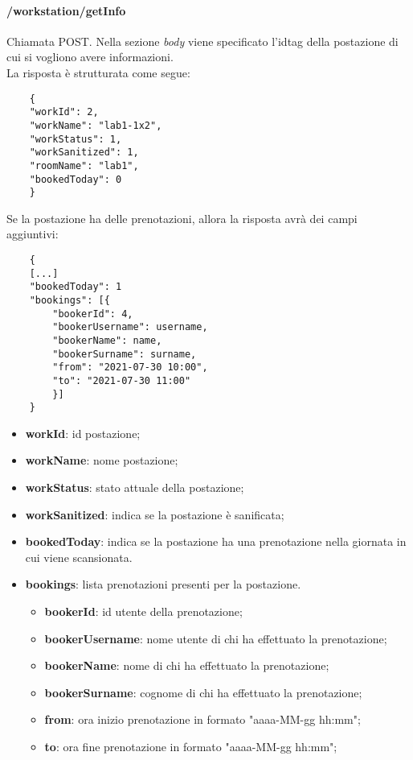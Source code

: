 \paragraph{/workstation/getInfo}
Chiamata POST. Nella sezione \textit{body} viene specificato l'idtag della postazione di cui si vogliono avere informazioni.\\
La risposta è strutturata come segue:
\begin{center}
	\begin{lstlisting}
	{
	"workId": 2,
	"workName": "lab1-1x2", 
	"workStatus": 1, 
	"workSanitized": 1, 
	"roomName": "lab1", 
	"bookedToday": 0
	}
	\end{lstlisting}
\end{center}
Se la postazione ha delle prenotazioni, allora la risposta avrà dei campi aggiuntivi:
\begin{center}
	\begin{lstlisting}
	{
	[...]
	"bookedToday": 1
	"bookings": [{
		"bookerId": 4,
		"bookerUsername": username,
		"bookerName": name,
		"bookerSurname": surname,
		"from": "2021-07-30 10:00",
		"to": "2021-07-30 11:00"
		}]
	}
	\end{lstlisting}
\end{center}
\begin{itemize}
	\item \textbf{workId}: id postazione;
	\item \textbf{workName}: nome postazione;	
	\item \textbf{workStatus}: stato attuale della postazione;	
	\item \textbf{workSanitized}: indica se la postazione è sanificata;
	\item \textbf{bookedToday}: indica se la postazione ha una prenotazione nella giornata in cui viene scansionata.
	\item \textbf{bookings}: lista prenotazioni presenti per la postazione.
	\begin{itemize}		
		\item \textbf{bookerId}: id utente della prenotazione;
		\item \textbf{bookerUsername}: nome utente di chi ha effettuato la prenotazione;
		\item \textbf{bookerName}: nome di chi ha effettuato la prenotazione;
		\item \textbf{bookerSurname}: cognome di chi ha effettuato la prenotazione;
		\item \textbf{from}: ora inizio prenotazione in formato "aaaa-MM-gg hh:mm";
		\item \textbf{to}: ora fine prenotazione in formato "aaaa-MM-gg hh:mm";
	\end{itemize}
\end{itemize}
